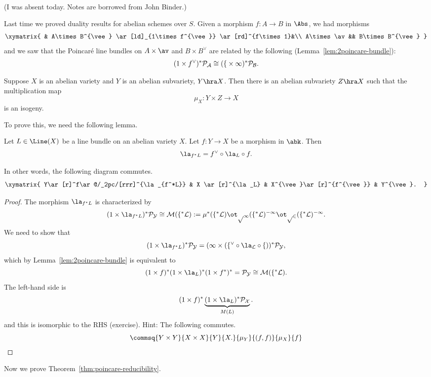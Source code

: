 
(I was absent today. Notes are borrowed from John Binder.)

Last time we proved duality results for abelian schemes over $S$. Given a morphism $f:A\to B$ in $\Abs$, we had morphisms
\[
\xymatrix{
& A\times B^{\vee} \ar[ld]_{1\times f^{\vee}} \ar[rd]^{f\times1}&\\
A\times \av && B\times B^{\vee}
}
\]
and we saw that the Poincar\'e line bundles on $A\times \av$ and $B\times B^{\vee}$ are related by the following (Lemma~\ref{lem:2poincare-bundle}):
\[
(1\times f^{\vee})^* \cal P_A\cong (f\times 1)^*\cal P_B.
\]

\begin{thm}
Suppose $X$ is an abelian variety and $Y$ is an abelian subvariety, $Y\hra X$. Then there is an abelian subvariety $Z\hra X$ such that the multiplication map %
\[
\mu_X:Y\times Z\to X
\] 
is an isogeny.
\end{thm}
To prove this, we need the following lemma.
\begin{lem}
Let $L\in \Line(X)$ be a line bundle on an abelian variety $X$. Let $f:Y\to X$ be a morphism in $\abk$. Then 
\[
\la_{f^*L}=f^{\vee}\circ \la_L \circ f.
\]
\end{lem}
In other words, the following diagram commutes.
\[
\xymatrix{
Y\ar[r]^f\ar@/_2pc/[rrr]^{\la_{f^*L}} & X \ar[r]^{\la_L} & X^{\vee}\ar[r]^{f^{\vee}} & Y^{\vee}.
}
\]
\begin{proof}
The morphism $\la_{f^* L}$ is characterized by
\[
(1\times \la_{f^*L})^* \cal P_Y \cong M(f^*L):=\mu^*(f^*L)\ot p_1(f^*L)^{-1}\ot p_2(f^*L)^{-1}.
\]
We need to show that
\[
(1\times \la_{f^*L})^*\cal P_Y = (1\times(f^{\vee}\circ \la_L\circ f))^* \cal P_Y,
\]
which by Lemma~\ref{lem:2poincare-bundle} is equivalent to
\[
(1\times f)^* (1\times \la_L)^*%
(1\times f^*)^*%
= \cal P_Y\cong M(f^*L).
\]
The left-hand side is 
\[
(1\times f)^*\underbrace{(1\times \la_L)^* \cal P_X}_{M(L)}.
\]
and this is isomorphic to the RHS (exercise). Hint: The following commutes.
\[
\commsq{Y\times Y}{X\times X}{Y}{X.}{\mu_Y}{(f,f)}{\mu_X}{f}
\]
\end{proof}
Now we prove Theorem~\ref{thm:poincare-reducibility}.
